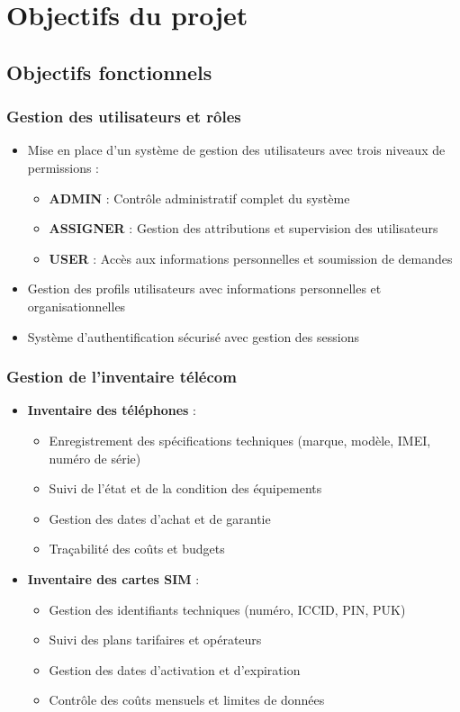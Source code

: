 \documentclass[12pt,a4paper]{report}
\begin{document}
\section{Objectifs du projet}

\subsection{Objectifs fonctionnels}

\subsubsection{Gestion des utilisateurs et rôles}
\begin{itemize}
\item Mise en place d'un système de gestion des utilisateurs avec trois niveaux de permissions :
  \begin{itemize}
  \item \textbf{ADMIN} : Contrôle administratif complet du système
  \item \textbf{ASSIGNER} : Gestion des attributions et supervision des utilisateurs
  \item \textbf{USER} : Accès aux informations personnelles et soumission de demandes
  \end{itemize}
\item Gestion des profils utilisateurs avec informations personnelles et organisationnelles
\item Système d'authentification sécurisé avec gestion des sessions
\end{itemize}

\subsubsection{Gestion de l'inventaire télécom}
\begin{itemize}
\item \textbf{Inventaire des téléphones} :
  \begin{itemize}
  \item Enregistrement des spécifications techniques (marque, modèle, IMEI, numéro de série)
  \item Suivi de l'état et de la condition des équipements
  \item Gestion des dates d'achat et de garantie
  \item Traçabilité des coûts et budgets
  \end{itemize}

\item \textbf{Inventaire des cartes SIM} :
  \begin{itemize}
  \item Gestion des identifiants techniques (numéro, ICCID, PIN, PUK)
  \item Suivi des plans tarifaires et opérateurs
  \item Gestion des dates d'activation et d'expiration
  \item Contrôle des coûts mensuels et limites de données
  \end{itemize}
\end{itemize}
\end{document}
